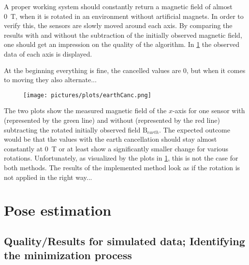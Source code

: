 A proper working system should constantly return a magnetic field of almost \SI{0}{\tesla}, when it is rotated in an environment without artificial magnets. In order to verify this, the sensors are slowly moved around each axis. By comparing the results with and without the subtraction of the initially observed magnetic field, one should get an impression on the quality of the algorithm. In \ref{fig:earthCancelRes} the observed data of each axis is displayed.

At the beginning everything is fine, the cancelled values are 0, but when it comes to moving they also alternate...

\begin{figure}
\centering
\texttt{[image: pictures/plots/earthCanc.png]} 
\caption{}
\label{fig:earthCancelRes}
\end{figure}

The two plots show the measured magnetic field of the $ x $-axis for one sensor with (represented by the green line) and without (represented by the red line) subtracting the rotated initially observed field $ \mathrm{B}_{earth} $. The expected outcome would be that the values with the earth cancellation should stay almost constantly at \SI{0}{\tesla} or at least show a significantly smaller change for various rotations. Unfortunately, as visualized by the plots in \ref{fig:earthCancelRes}, this is not the case for both methods. The results of the implemented method look as if the rotation is not applied in the right way...





\section{Pose estimation} \label{sec:estimationRes}

\subsection{Quality/Results for simulated data; Identifying the minimization process} \label{subsec:resSim}

